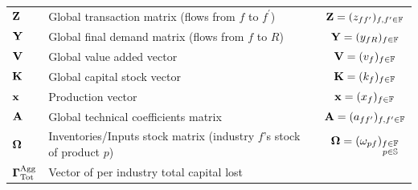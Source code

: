 {\begin{table}[H]
\begin{tabularx}{\linewidth}{
      p{4.5cm}Xc
      }
      $\mathbf{Z}$ & Global transaction matrix (flows from $f$ to $f^{\prime}$) & $\mathbf{Z} = (z_{ff^{\prime}})_{f,f^{\prime} \in \mathbb{F}}$ \\
      $\mathbf{Y}$ & Global final demand matrix (flows from $f$ to $R$) & $\mathbf{Y} = (y_{fR})_{f \in \mathbb{F}}$ \\
      $\mathbf{V}$ & Global value added vector & $\mathbf{V} =  (v_{f})_{f \in \mathbb{F}}$ \\
      $\mathbf{K}$ & Global capital stock vector & $\mathbf{K} =  (k_{f})_{f \in \mathbb{F}}$ \\
      $\mathbf{x}$ & Production vector & $\mathbf{x} = (x_{f})_{f \in \mathbb{F}}$ \\
      $\mathbf{A}$ & Global technical coefficients matrix & $\mathbf{A} =  (a_{ff^{\prime}})_{f,f^{\prime} \in \mathbb{F}}$ \\
      $\mathbf{\Omega}$ & Inventories/Inputs stock matrix (industry $f$'s stock of
                 product $p$) & $\mathbf{\Omega} = (\omega_{pf})_{\substack{f \in \mathbb{F}\\ p \in \mathbb{S}}}$ \\
      $\mathbf{\Gamma}^{\textrm{Agg}}_{\textrm{Tot}}$ & Vector of per industry total capital lost

\end{tabularx}
\end{table}}
